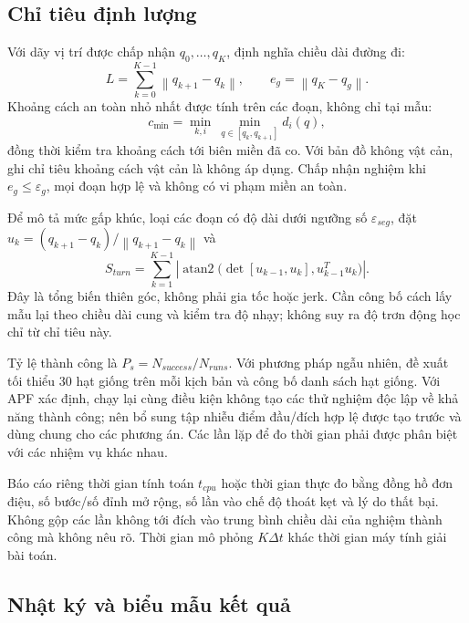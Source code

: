 \documentclass[12pt,a4paper,oneside]{report}
\numberwithin{equation}{chapter}
\newcommand{\norm}[1]{\left\lVert #1\right\rVert}
\begin{document}
\subsection{Chỉ tiêu định lượng}

Với dãy vị trí được chấp nhận $q_0,\ldots,q_K$, định nghĩa chiều dài đường đi:
\begin{equation}
L=\sum_{k=0}^{K-1}\norm{q_{k+1}-q_k},\qquad e_g=\norm{q_K-q_g}.
\end{equation}
Khoảng cách an toàn nhỏ nhất được tính trên các đoạn, không chỉ tại mẫu:
\begin{equation}
c_{\min}=\min_{k,i}\ \min_{q\in[q_k,q_{k+1}]}d_i(q),
\end{equation}
đồng thời kiểm tra khoảng cách tới biên miền đã co. Với bản đồ không vật cản, ghi chỉ tiêu khoảng cách vật cản là không áp dụng. Chấp nhận nghiệm khi $e_g\le\varepsilon_g$, mọi đoạn hợp lệ và không có vi phạm miền an toàn.

Để mô tả mức gấp khúc, loại các đoạn có độ dài dưới ngưỡng số $\varepsilon_{seg}$, đặt $u_k=(q_{k+1}-q_k)/\norm{q_{k+1}-q_k}$ và
\begin{equation}
S_{turn}=\sum_{k=1}^{K-1}\left|\operatorname{atan2}
\bigl(\det[u_{k-1},u_k],u_{k-1}^Tu_k\bigr)\right|.
\end{equation}
Đây là tổng biến thiên góc, không phải gia tốc hoặc jerk. Cần công bố cách lấy mẫu lại theo chiều dài cung và kiểm tra độ nhạy; không suy ra độ trơn động học chỉ từ chỉ tiêu này.

Tỷ lệ thành công là $P_s=N_{success}/N_{runs}$. Với phương pháp ngẫu nhiên, đề xuất tối thiểu 30 hạt giống trên mỗi kịch bản và công bố danh sách hạt giống. Với APF xác định, chạy lại cùng điều kiện không tạo các thử nghiệm độc lập về khả năng thành công; nên bổ sung tập nhiễu điểm đầu/đích hợp lệ được tạo trước và dùng chung cho các phương án. Các lần lặp để đo thời gian phải được phân biệt với các nhiệm vụ khác nhau.

Báo cáo riêng thời gian tính toán $t_{cpu}$ hoặc thời gian thực đo bằng đồng hồ đơn điệu, số bước/số đỉnh mở rộng, số lần vào chế độ thoát kẹt và lý do thất bại. Không gộp các lần không tới đích vào trung bình chiều dài của nghiệm thành công mà không nêu rõ. Thời gian mô phỏng $K\Delta t$ khác thời gian máy tính giải bài toán.

\subsection{Nhật ký và biểu mẫu kết quả}
\end{document}
